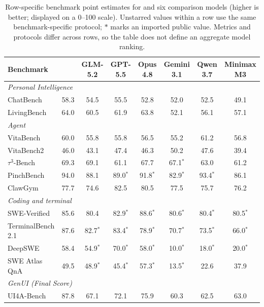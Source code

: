 \begin{table}[!t]
  \centering
  \caption{Row-specific benchmark point estimates for \venti{} and six comparison models (higher is better; displayed on a 0--100 scale). Unstarred values within a row use the same benchmark-specific protocol; \(\ast\) marks an imported public value. Metrics and protocols differ across rows, so the table does not define an aggregate model ranking.}
  \label{tab:eval_results}
  \footnotesize
  \setlength{\tabcolsep}{4.25pt}
  \begin{tabular}{lccccccc}
    \toprule
    Benchmark & \venti{} & GLM-5.2 & GPT-5.5 & Opus 4.8 & Gemini 3.1 & Qwen 3.7 & Minimax M3 \\
    \midrule
    \multicolumn{8}{l}{\emph{Personal Intelligence}} \\
    ChatBench          & 58.3 & 54.5 & 55.5 & 52.8 & 52.0 & 52.5 & 49.1 \\
    LivingBench        & 64.0 & 60.5 & 61.9 & 63.8 & 52.1 & 56.1 & 57.1 \\
    \midrule
    \multicolumn{8}{l}{\emph{Agent}} \\
    VitaBench          & 60.0 & 55.8 & 55.8 & 56.5 & 55.2 & 61.2 & 56.8 \\
    VitaBench2         & 46.0 & 43.1 & 47.4 & 46.3 & 50.2 & 47.6 & 39.4 \\
    $\tau^3$-Bench     & 69.3 & 69.1 & 61.1 & 67.7 & 67.1$^{\ast}$ & 63.0 & 61.2 \\
    PinchBench         & 94.0 & 88.1 & 89.0\(^{\ast}\) & 91.8\(^{\ast}\) & 82.9\(^{\ast}\) & 93.4\(^{\ast}\) & 86.1 \\
    ClawGym            & 77.7 & 74.6 & 82.5 & 80.5 & 77.5 & 75.7 & 76.2 \\
    \midrule
    \multicolumn{8}{l}{\emph{Coding and terminal}} \\
    SWE-Verified       & 85.6 & 80.4 & 82.9\(^{\ast}\) & 88.6\(^{\ast}\) & 80.6\(^{\ast}\) & 80.4\(^{\ast}\) & 80.5\(^{\ast}\) \\
    TerminalBench 2.1  & 87.6 & 82.7\(^{\ast}\) & 83.4\(^{\ast}\) & 78.9\(^{\ast}\) & 70.7\(^{\ast}\) & 73.5\(^{\ast}\) & 66.0\(^{\ast}\) \\
    DeepSWE            & 58.4 & 54.9\(^{\ast}\) & 70.0\(^{\ast}\) & 58.0\(^{\ast}\) & 10.0\(^{\ast}\) & 18.0\(^{\ast}\) & 20.0\(^{\ast}\) \\
    SWE Atlas QnA      & 49.5 & 48.9\(^{\ast}\) & 45.4\(^{\ast}\) & 57.3\(^{\ast}\) & 13.5\(^{\ast}\) & 22.6 & 37.9 \\
    \midrule
    \multicolumn{8}{l}{\emph{GenUI (Final Score)}} \\
    UI4A-Bench         & 87.8 & 67.1 & 72.1 & 75.9 & 60.3 & 62.5 & 63.0 \\
    \bottomrule
  \end{tabular}
\end{table}

